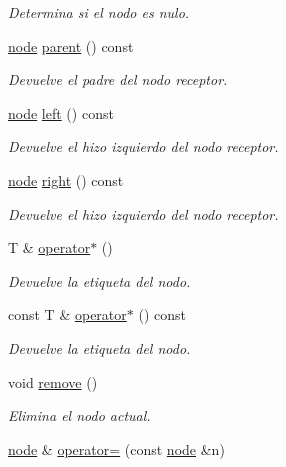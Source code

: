 \begin{DoxyCompactItemize}
\begin{DoxyCompactList}\small\item\em Determina si el nodo es nulo. \end{DoxyCompactList}\item 
\hyperlink{classbintree_1_1node}{node} \hyperlink{classbintree_1_1node_a09ca860544efb439a685bbeb5d3107a9}{parent} () const 
\begin{DoxyCompactList}\small\item\em Devuelve el padre del nodo receptor. \end{DoxyCompactList}\item 
\hyperlink{classbintree_1_1node}{node} \hyperlink{classbintree_1_1node_a21bdc0016677746f28b3c44bdb69c3c2}{left} () const 
\begin{DoxyCompactList}\small\item\em Devuelve el hizo izquierdo del nodo receptor. \end{DoxyCompactList}\item 
\hyperlink{classbintree_1_1node}{node} \hyperlink{classbintree_1_1node_a547b66653137db889451d4dbaffde8f9}{right} () const 
\begin{DoxyCompactList}\small\item\em Devuelve el hizo izquierdo del nodo receptor. \end{DoxyCompactList}\item 
T \& \hyperlink{classbintree_1_1node_ae3b25e1d16c449a3c0e211cd0ebe5739}{operator$\ast$} ()
\begin{DoxyCompactList}\small\item\em Devuelve la etiqueta del nodo. \end{DoxyCompactList}\item 
const T \& \hyperlink{classbintree_1_1node_af9119b26b416b2a8a8c8b1ff7ec1a3e7}{operator$\ast$} () const 
\begin{DoxyCompactList}\small\item\em Devuelve la etiqueta del nodo. \end{DoxyCompactList}\item 
void \hyperlink{classbintree_1_1node_acd508d5b931d66a1794cc1e2c6242e5c}{remove} ()
\begin{DoxyCompactList}\small\item\em Elimina el nodo actual. \end{DoxyCompactList}\item 
\hyperlink{classbintree_1_1node}{node} \& \hyperlink{classbintree_1_1node_a184f20617c0324caa3f66e4dce1338e5}{operator=} (const \hyperlink{classbintree_1_1node}{node} \&n)

\end{DoxyCompactItemize}
